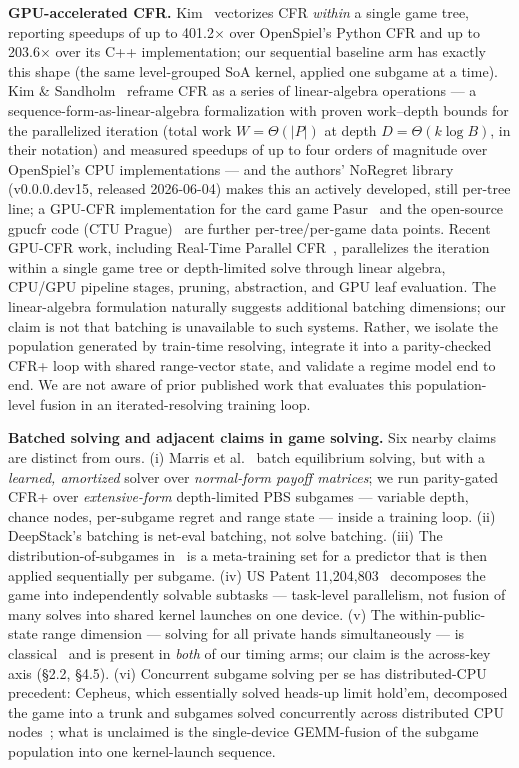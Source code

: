 \documentclass[11pt]{article}
\begin{document}
\textbf{GPU-accelerated CFR.} Kim~\citep{Kim2024} vectorizes CFR \emph{within} a single
game tree, reporting speedups of up to 401.2$\times$ over OpenSpiel's Python CFR and up
to 203.6$\times$ over its C++ implementation; our sequential baseline arm has exactly
this shape (the same level-grouped
SoA kernel, applied one subgame at a time). Kim \& Sandholm~\citep{KimSandholm2026}
reframe CFR as a series of linear-algebra operations --- a
sequence-form-as-linear-algebra formalization with proven work--depth bounds for the
parallelized iteration (total work $W = \Theta(|P|)$ at depth $D = \Theta(k \log B)$, in
their notation) and measured speedups of up to four orders of magnitude over OpenSpiel's
CPU implementations --- and the authors' NoRegret library
(v0.0.0.dev15, released 2026-06-04) makes this an actively developed, still per-tree
line; a GPU-CFR implementation for the card game Pasur~\citep{Pasur-GPU} and the
open-source gpucfr code (CTU Prague)~\citep{gpucfr} are further per-tree/per-game data
points. Recent GPU-CFR work, including Real-Time Parallel CFR~\citep{RealTimeParallelCFR},
parallelizes the iteration within a single game tree or depth-limited solve through
linear algebra, CPU/GPU pipeline stages, pruning, abstraction, and GPU leaf evaluation.
The linear-algebra formulation naturally suggests additional batching dimensions; our
claim is not that batching is unavailable to such systems. Rather, we isolate the
population generated by train-time resolving, integrate it into a parity-checked CFR+
loop with shared range-vector state, and validate a regime model end to end. We are not
aware of prior published work that evaluates this population-level fusion in an
iterated-resolving training loop.

\textbf{Batched solving and adjacent claims in game solving.} Six nearby claims are
distinct from ours. (i) Marris et al.~\citep{Marris2022} batch equilibrium solving, but
with a \emph{learned, amortized} solver over \emph{normal-form payoff matrices}; we run
parity-gated CFR+ over \emph{extensive-form} depth-limited PBS subgames --- variable
depth, chance nodes, per-subgame regret and range state --- inside a training loop.
(ii) DeepStack's batching is net-eval batching, not solve batching. (iii) The
distribution-of-subgames in~\citep{NPCFR} is a meta-training set for a predictor that is
then applied sequentially per subgame. (iv) US Patent
11,204,803~\citep{USPTO11204803} decomposes the game into independently solvable
subtasks --- task-level parallelism, not fusion of many solves into shared kernel
launches on one device. (v) The within-public-state range dimension --- solving for all
private hands simultaneously --- is classical~\citep{Johanson2011,Johanson2012} and is
present in \emph{both} of our timing arms; our claim is the across-key axis (\S2.2,
\S4.5). (vi) Concurrent subgame solving per se has distributed-CPU precedent: Cepheus,
which essentially solved heads-up limit hold'em, decomposed the game into a trunk and
subgames solved concurrently across distributed CPU
nodes~\citep{Bowling2015,Tammelin2015}; what is unclaimed is the single-device
GEMM-fusion of the subgame population into one kernel-launch sequence.
\end{document}
